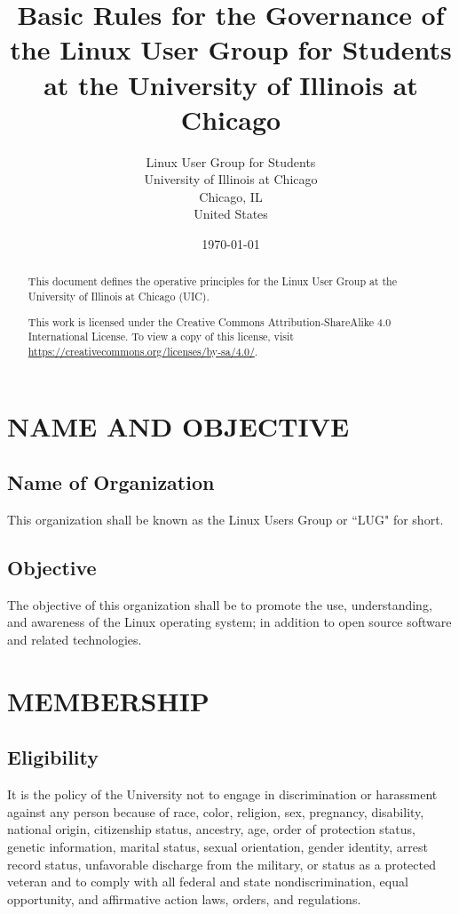 \documentclass[letter]{report}
\begin{document}

\title{Basic Rules for the Governance of the Linux User Group for Students at the University
	of Illinois at Chicago}
\author{Linux User Group for Students\\
	University of Illinois at Chicago\\
	Chicago, IL\\
	United States}
\date{\today}
\maketitle


\begin{abstract}
	This document defines the operative principles for the Linux
	User Group at the University of Illinois at Chicago (UIC).

	\vfill
	This work is licensed under the Creative Commons Attribution-ShareAlike
	4.0 International License. To view a copy of this license, visit
	\url{https://creativecommons.org/licenses/by-sa/4.0/}.
\end{abstract}


\tableofcontents


\chapter{NAME AND OBJECTIVE}
\section{Name of Organization}
This organization shall be known as the Linux Users Group or ``LUG" for short.

\section{Objective}
The objective of this organization shall be to promote the use, understanding,
and awareness of the Linux operating system; in addition to open source software
and related technologies.


\chapter{MEMBERSHIP}
\section{Eligibility}
It is the policy of the University not to engage in discrimination or harassment
against any person because of race, color, religion, sex, pregnancy, disability,
national origin, citizenship status, ancestry, age, order of protection status,
genetic information, marital status, sexual orientation, gender identity, arrest
record status,  unfavorable discharge from the military, or status as a
protected veteran and to comply with all federal and state nondiscrimination,
equal opportunity, and affirmative action laws, orders, and regulations.
\end{document}
